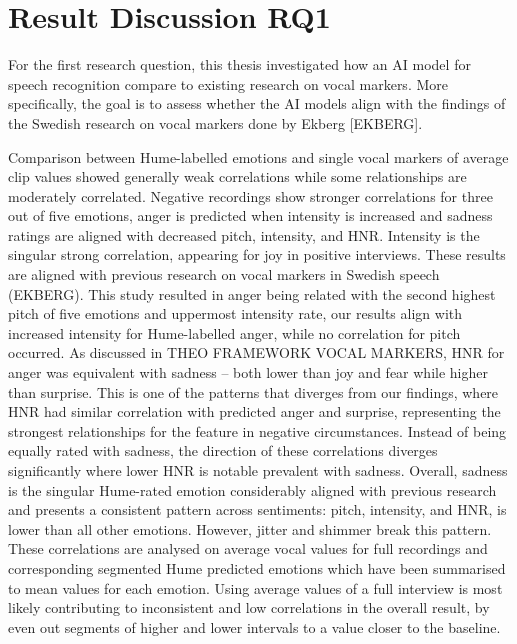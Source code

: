 \section{Result Discussion RQ1}
For the first research question, this thesis investigated how an AI model for speech recognition
compare to existing research on vocal markers. More specifically, the goal is to assess whether
the AI models align with the findings of the Swedish research on vocal markers done by Ekberg
[EKBERG]. 

Comparison between Hume-labelled emotions and single vocal markers of average clip values showed generally weak correlations while some relationships are moderately correlated. 
Negative recordings show stronger correlations for three out of five emotions, anger is predicted when intensity is increased and sadness ratings are aligned with decreased pitch, intensity, and HNR. 
Intensity is the singular strong correlation, appearing for joy in positive interviews. These results are aligned with previous research on vocal markers in 
Swedish speech (EKBERG). This study resulted in anger being related with the second highest pitch of five emotions and uppermost intensity rate, 
our results align with increased intensity for Hume-labelled anger, while no correlation for pitch occurred. As discussed in THEO FRAMEWORK VOCAL MARKERS, HNR for anger was equivalent with sadness $–$ both lower than joy and fear while higher than surprise. 
This is one of the patterns that diverges from our findings, where HNR had similar correlation with predicted anger and surprise, representing the strongest relationships for the feature in negative circumstances. Instead of being equally rated with sadness, 
the direction of these correlations diverges significantly where lower HNR is notable prevalent with sadness. Overall, sadness is the singular Hume-rated emotion considerably aligned with previous research and presents a consistent pattern across sentiments: 
pitch, intensity, and HNR, is lower than all other emotions. However, jitter and shimmer break this pattern. These correlations are analysed on average vocal values for full recordings and corresponding segmented Hume predicted emotions which have been summarised to mean values for each emotion. 
Using average values of a full interview is most likely contributing to inconsistent and low correlations in the overall result, by even out segments of higher and lower intervals to a value closer to the baseline.   

